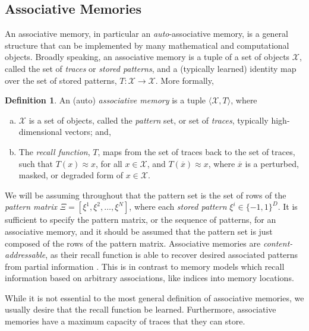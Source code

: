 \documentclass{article}
\theoremstyle{definition}
\newtheorem{definition}{Definition}[subsection]
\begin{document}
\subsection{Associative Memories}\label{sec:associative-memories}

An associative memory, in particular an \textit{auto}-associative memory,
is a general structure that can be implemented by many mathematical
and computational objects. Broadly speaking, an associative memory is a
tuple of a set of objects $\mathcal X$, called the set of
\textit{traces} or \textit{stored patterns},
and a (typically learned) identity map over the set of stored
patterns, $T: \mathcal X \to \mathcal X$.
More formally,

\begin{definition}
  An (auto) \textit{associative memory} is a tuple $\langle \mathcal
  X, T \rangle$, where
  \begin{enumerate}[(a)]
    \item $\mathcal X$ is a set of objects, called the
      \textit{pattern} set, or set of \textit{traces}, typically
      high-dimensional vectors; and,
    \item The \textit{recall function}, $T$, maps from the set
      of traces back to
      the set of traces, such that $T(x) \approx x$, for all $x \in
      \mathcal{X}$,
      and $T(\overline x) \approx x$, where $\overline x$ is a
      perturbed, masked, or degraded form of $x \in \mathcal{X}$.
  \end{enumerate}
\end{definition}

We will be assuming throughout that the pattern set is the set of rows
of the \textit{pattern matrix} $\Xi = [\xi^1, \xi^2, \dots, \xi^N]$,
where each \textit{stored pattern} $\xi^i \in \{-1, 1\}^D$. It is sufficient
to specify the pattern matrix, or the sequence of patterns, for an
associative memory,
and it should be assumed that the pattern set is just composed of the
rows of the pattern matrix.
Associative memories are \textit{content-addressable}, as their recall function
is able to recover desired associated patterns from partial information
\parencites{mcclelland_appeal_1986,haykin_neural_2009}. This is in
contrast to memory models which recall information based on arbitrary
associations, like indices into memory locations.

While it is not essential to the most general definition of
associative memories,
we usually desire that the recall function be learned. Furthermore,
associative memories have a maximum capacity of traces that they can store.
\end{document}
